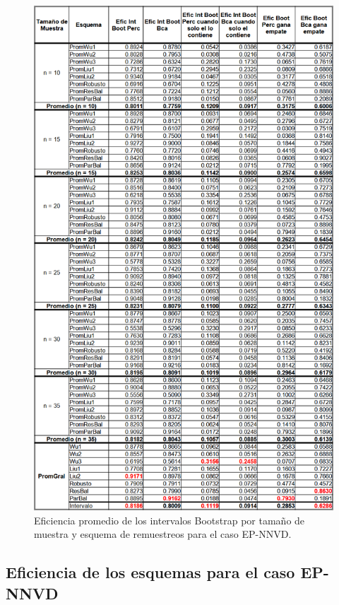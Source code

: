 \begin{figure}[ht] 
	\centering 
	\includegraphics[width=0.75\linewidth]{img/EP_NNVD_Efic_Boots.png} 
	\caption{Eficiencia promedio de los intervalos Bootstrap por tamaño de muestra y esquema de remuestreos para el caso EP-NNVD.} 
	\label{fig:EP_NNVD_Boots}
\end{figure}

\subsection{Eficiencia de los esquemas para el caso EP-NNVD}

